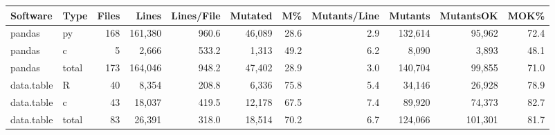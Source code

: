 \begin{tabular}{llrrrrrrrrr}
  \hline
Software & Type & Files & Lines & Lines/File & Mutated & M\% & Mutants/Line & Mutants & MutantsOK & MOK\% \\ 
  \hline
pandas & py & 168 & 161,380 & 960.6 & 46,089 & 28.6 & 2.9 & 132,614 & 95,962 & 72.4 \\ 
  pandas & c &  5 & 2,666 & 533.2 & 1,313 & 49.2 & 6.2 & 8,090 & 3,893 & 48.1 \\ 
  pandas & total & 173 & 164,046 & 948.2 & 47,402 & 28.9 & 3.0 & 140,704 & 99,855 & 71.0 \\ 
  data.table & R & 40 & 8,354 & 208.8 & 6,336 & 75.8 & 5.4 & 34,146 & 26,928 & 78.9 \\ 
  data.table & c & 43 & 18,037 & 419.5 & 12,178 & 67.5 & 7.4 & 89,920 & 74,373 & 82.7 \\ 
  data.table & total & 83 & 26,391 & 318.0 & 18,514 & 70.2 & 6.7 & 124,066 & 101,301 & 81.7 \\ 
   \hline
\end{tabular}
